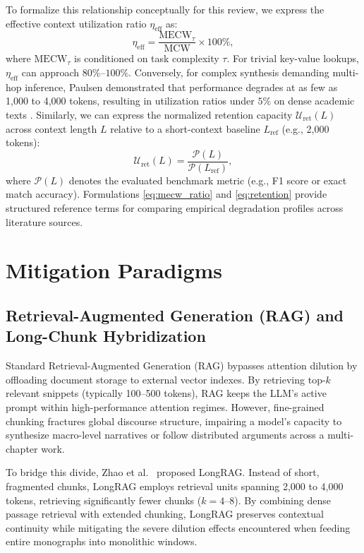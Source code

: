 \documentclass[manuscript]{acmart}
\begin{document}
To formalize this relationship conceptually for this review, we express the effective context utilization ratio $\eta_{\mathrm{eff}}$ as:
\begin{equation}
    \eta_{\mathrm{eff}} = \frac{\mathrm{MECW}_{\tau}}{\mathrm{MCW}} \times 100\%,
    \label{eq:mecw_ratio}
\end{equation}
where $\mathrm{MECW}_{\tau}$ is conditioned on task complexity $\tau$. For trivial key-value lookups, $\eta_{\mathrm{eff}}$ can approach $80\%\text{--}100\%$. Conversely, for complex synthesis demanding multi-hop inference, Paulsen demonstrated that performance degrades at as few as 1,000 to 4,000 tokens, resulting in utilization ratios under $5\%$ on dense academic texts \cite{paulsen2025mecw}. Similarly, we can express the normalized retention capacity $\mathcal{U}_{\mathrm{ret}}(L)$ across context length $L$ relative to a short-context baseline $L_{\mathrm{ref}}$ (e.g., 2,000 tokens):
\begin{equation}
    \mathcal{U}_{\mathrm{ret}}(L) = \frac{\mathcal{P}(L)}{\mathcal{P}(L_{\mathrm{ref}})},
    \label{eq:retention}
\end{equation}
where $\mathcal{P}(L)$ denotes the evaluated benchmark metric (e.g., F1 score or exact match accuracy). Formulations \eqref{eq:mecw_ratio} and \eqref{eq:retention} provide structured reference terms for comparing empirical degradation profiles across literature sources.

\section{Mitigation Paradigms}\label{sec:mitigations}

\subsection{Retrieval-Augmented Generation (RAG) and Long-Chunk Hybridization}
Standard Retrieval-Augmented Generation (RAG) \cite{lewis2020rag} bypasses attention dilution by offloading document storage to external vector indexes. By retrieving top-$k$ relevant snippets (typically 100--500 tokens), RAG keeps the LLM's active prompt within high-performance attention regimes. However, fine-grained chunking fractures global discourse structure, impairing a model's capacity to synthesize macro-level narratives or follow distributed arguments across a multi-chapter work.

To bridge this divide, Zhao et al.~\cite{zhao2024longrag} proposed LongRAG. Instead of short, fragmented chunks, LongRAG employs retrieval units spanning 2,000 to 4,000 tokens, retrieving significantly fewer chunks ($k=4\text{--}8$). By combining dense passage retrieval with extended chunking, LongRAG preserves contextual continuity while mitigating the severe dilution effects encountered when feeding entire monographs into monolithic windows.
\end{document}
